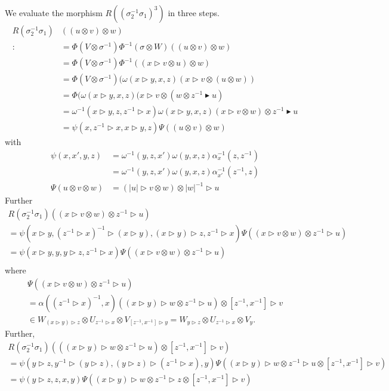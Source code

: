 \documentclass[11pt]{book}
\theoremstyle{Rem}
\theoremstyle{definition}
\numberwithin{equation}{section}
\newcommand\hit{\triangleright}
\newcommand\bhit{\blacktriangleright}
\newcommand\inv{^{-1}}
\newcommand\ot{\otimes}
\begin{document}
We evaluate the morphism $R((\sigma_2\inv\sigma_1)^3)$ in three steps.
\begin{align*}
  R(\sigma_2\inv\sigma_1)&((u\ot v)\ot w)\\
                         :&=\Phi(V\ot\sigma\inv)\Phi\inv(\sigma\ot W)((u\ot v)\ot w)\\
  &=\Phi(V\ot\sigma\inv)\Phi\inv((x\hit v\ot u)\ot w)\\
  &=\Phi(V\ot\sigma\inv)(\omega(x\hit y,x,z)(x\hit v\ot(u\ot w))\\
  &=\Phi(\omega(x\hit y,x,z)(x\hit v\ot (w\ot z\inv\bhit u)\\
                         &=\omega\inv(x\hit y,z,z\inv\hit x)\omega(x\hit y,x,z)(x\hit v\ot w)\ot z\inv\bhit u\\
                         &=\psi(x,z\inv\hit x,x\hit y,z)\Psi((u\ot v)\ot w)
 \end{align*}
 with
 \begin{align*}
   \psi(x,x',y,z)&=\omega\inv(y,z,x')\omega(y,x,z)\alpha_x\inv(z,z\inv)\\
              &=\omega\inv(y,z,x')\omega(y,x,z)\alpha_{x'}\inv(z\inv,z)\\
            \Psi(u\ot v\ot w)&=(|u|\hit v\ot w)\ot |w|\inv\hit u
\end{align*}
Further
\begin{multline*}
  R(\sigma_2\inv\sigma_1)((x\hit v\ot w)\ot z\inv\hit u)\\
  =\psi(x\hit y,(z\inv\hit x)\inv\hit(x\hit y),(x\hit y)\hit z,z\inv\hit x)\Psi((x\hit v\ot w)\ot z\inv\hit u)
  \\ 
  =\psi(x\hit y,y,y\hit z,z\inv\hit x)\Psi((x\hit v\ot w)\ot z\inv\hit u)\\
\end{multline*}
where
\begin{multline*} \Psi((x\hit v\ot w)\ot z\inv\hit u)\\
  =\alpha((z\inv\hit x)\inv, x)((x\hit y)\hit w\ot z\inv\hit u)\ot [z\inv,x\inv]\hit v\\
  \in W_{(x\hit y)\hit z}\ot U_{z\inv\hit x}\ot V_{[z\inv,x\inv]\hit y}=W_{y\hit z}\ot U_{z\inv\hit x}\ot V_y.
\end{multline*}
Further,
\begin{multline*}
  R(\sigma_2\inv\sigma_1)(((x\hit y)\hit w\ot z\inv\hit u)\ot[z\inv,x\inv]\hit v)\\
  =\psi(y\hit z,y\inv\hit(y\hit z),(y\hit z)\hit(z\inv\hit x),y)\Psi((x\hit y)\hit w\ot z\inv\hit u\ot[z\inv,x\inv]\hit v)\\
  =\psi(y\hit z,z,x,y)\Psi((x\hit y)\hit w\ot z\inv\hit z\ot[z\inv,x\inv]\hit v)\\
\end{multline*}
\end{document}
